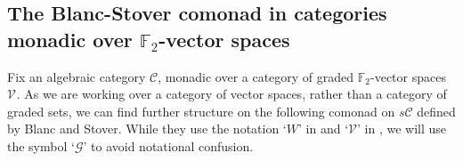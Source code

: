 \documentclass[11pt]{amsart} \renewcommand{\baselinestretch}{1.2}
\theoremstyle{plain}
\numberwithin{equation}{section} %
\theoremstyle{plain}
\numberwithin{equation}{chapter} %
\renewcommand{\to}{\longrightarrow}
\newcommand{\scrG}{\mathscr{G}}
\newcommand{\scrV}{\mathscr{V}}
\newcommand{\calV}{\mathcal{V}}
\newcommand{\calc}{\mathcal{C}}
\newcommand{\vect}[2]{\calV^{#1}_{#2}}
\newcommand{\BSW}{{\scrG}}
\newcommand{\F}{\mathbb{F}}
\newcommand{\complexes}{\mathrm{ch}_+}
\newcommand{\Ftwo}{\F_2}
\newcommand{\SubsectionOrSection}[1]{\subsection{#1}}
\begin{document}
\begin{Comp funct sseqs}
\SubsectionOrSection{The Blanc-Stover comonad in categories monadic over $\Ftwo $-vector spaces}\label{The Blanc-Stover comonad sect}
Fix an algebraic category $\calc$, monadic over a category of graded $\Ftwo $-vector spaces $\vect{}{}$. %
As we are working over a category of vector spaces, rather than a category of graded sets, we can find further structure on  the following comonad on $s\calc$ defined by Blanc and Stover. While they  use the notation `$W$' in \cite{Blanc_Stover-Groth_SS.pdf} and `$\scrV$' in \cite{StoverVanKampen.pdf}, we will use the symbol `$\BSW$' to avoid notational confusion.

\end{Comp funct sseqs}
\end{document}
